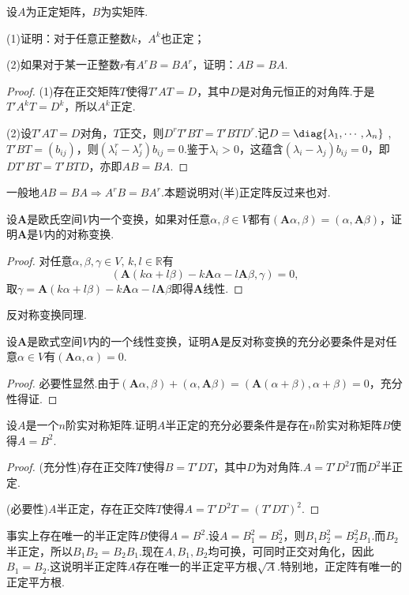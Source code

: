 \begin{prob}[19]
	设$A$为正定矩阵，$B$为实矩阵.

	(1)证明：对于任意正整数$k$，$A^k$也正定；

	(2)如果对于某一正整数$r$有$A^rB=BA^r$，证明：$AB=BA$.
\end{prob}
\begin{proof}
	(1)存在正交矩阵$T$使得$T'AT=D$，其中$D$是对角元恒正的对角阵.于是$T'A^kT=D^k$，所以$A^k$正定.

	(2)设$T'AT=D$对角，$T$正交，则$D^rT'BT=T'BTD^r$.记$D=\diag{\lambda_1,\cdots,\lambda_n}$ , $T'BT=(b_{ij})$，则$(\lambda_i^r-\lambda_j^r)b_{ij}=0$.鉴于$\lambda_i>0$，这蕴含$(\lambda_i-\lambda_j)b_{ij}=0$，即$DT'BT=T'BTD$，亦即$AB=BA$.
\end{proof}
\begin{note}
	一般地$AB=BA\Rightarrow A^rB=BA^r$.本题说明对(半)正定阵反过来也对.
\end{note}
\begin{prob}[20]
	设$\bm A$是欧氏空间$V$内一个变换，如果对任意$\alpha,\beta\in V$都有$(\bm A\alpha,\beta)=(\alpha,\bm A\beta)$，证明$\bm A$是$V$内的对称变换.
\end{prob}
\begin{proof}
	对任意$\alpha,\beta,\gamma\in V,\,k,l\in\mathbb{R}$有
	\[
		(\bm A(k\alpha+l\beta)-k\bm A\alpha-l\bm A\beta,\gamma)=0,
	\]
	取$\gamma=\bm A(k\alpha+l\beta)-k\bm A\alpha-l\bm A\beta$即得$\bm A$线性.
\end{proof}
\begin{note}
	反对称变换同理.
\end{note}
\begin{prob}[21]
	设$\bm A$是欧式空间$V$内的一个线性变换，证明$\bm A$是反对称变换的充分必要条件是对任意$\alpha\in V$有$(\bm A\alpha,\alpha)=0$.
\end{prob}
\begin{proof}
	必要性显然.由于$(\bm A\alpha,\beta)+(\alpha,\bm A\beta)=(\bm A(\alpha+\beta),\alpha+\beta)=0$，充分性得证.
\end{proof}
\begin{prob}[22]
	设$A$是一个$n$阶实对称矩阵.证明$A$半正定的充分必要条件是存在$n$阶实对称矩阵$B$使得$A=B^2$.
\end{prob}
\begin{proof}
	(充分性)存在正交阵$T$使得$B=T'DT$，其中$D$为对角阵.$A=T'D^2T$而$D^2$半正定.

	(必要性)$A$半正定，存在正交阵$T$使得$A=T'D^2T=(T'DT)^2$.
\end{proof}
\begin{note}
	事实上存在唯一的半正定阵$B$使得$A=B^2$.设$A=B_1^2=B_2^2$，则$B_1B_2^2=B_2^2B_1$.而$B_2$半正定，所以$B_1B_2=B_2B_1$.现在$A,B_1,B_2$均可换，可同时正交对角化，因此$B_1=B_2$.这说明半正定阵$A$存在唯一的半正定平方根$\sqrt A$.特别地，正定阵有唯一的正定平方根.
\end{note}
